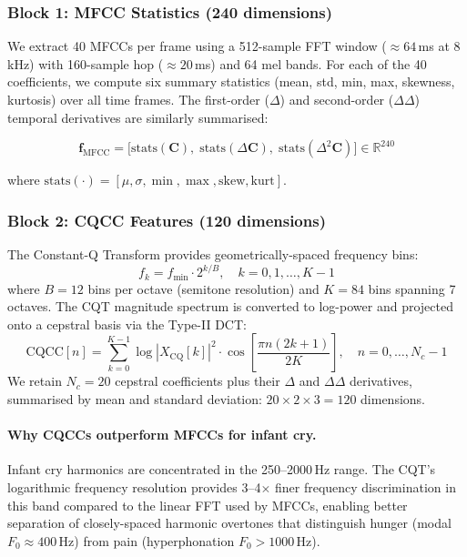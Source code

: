 \documentclass[11pt,a4paper]{article}
\begin{document}
\subsubsection{Block 1: MFCC Statistics (240 dimensions)}

We extract 40 MFCCs per frame using a 512-sample FFT window
($\approx 64$\,ms at 8\,kHz) with 160-sample hop ($\approx 20$\,ms)
and 64 mel bands. For each of the 40 coefficients, we compute six
summary statistics (mean, std, min, max, skewness, kurtosis) over all
time frames. The first-order ($\Delta$) and second-order
($\Delta\Delta$) temporal derivatives are similarly summarised:

\begin{equation}
  \mathbf{f}_{\text{MFCC}} = \bigl[
    \text{stats}(\mathbf{C}), \;
    \text{stats}(\Delta\mathbf{C}), \;
    \text{stats}(\Delta^2\mathbf{C})
  \bigr] \in \mathbb{R}^{240}
\end{equation}

\noindent
where $\text{stats}(\cdot) = [\mu, \sigma, \min, \max, \text{skew}, \text{kurt}]$.

\subsubsection{Block 2: CQCC Features (120 dimensions)}

The Constant-Q Transform provides geometrically-spaced frequency bins:
\begin{equation}
  f_k = f_{\min} \cdot 2^{k / B}, \quad k = 0, 1, \dots, K-1
\end{equation}
where $B = 12$ bins per octave (semitone resolution) and $K = 84$
bins spanning 7 octaves. The CQT magnitude spectrum is converted to
log-power and projected onto a cepstral basis via the Type-II DCT:
\begin{equation}
  \text{CQCC}[n] = \sum_{k=0}^{K-1} \log|X_{\text{CQ}}[k]|^2 \cdot
    \cos\!\left[\frac{\pi n (2k+1)}{2K}\right], \quad n = 0, \dots, N_c - 1
\end{equation}
We retain $N_c = 20$ cepstral coefficients plus their $\Delta$ and
$\Delta\Delta$ derivatives, summarised by mean and standard deviation:
$20 \times 2 \times 3 = 120$ dimensions.

\paragraph{Why CQCCs outperform MFCCs for infant cry.}
Infant cry harmonics are concentrated in the 250--2000\,Hz range.
The CQT's logarithmic frequency resolution provides 3--4$\times$ finer
frequency discrimination in this band compared to the linear FFT used
by MFCCs, enabling better separation of closely-spaced harmonic
overtones that distinguish hunger (modal $F_0 \approx 400$\,Hz) from
pain (hyperphonation $F_0 > 1000$\,Hz).
\end{document}

